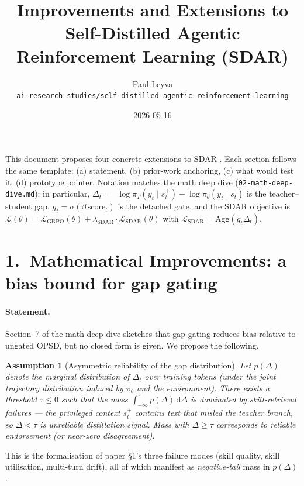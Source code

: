 \documentclass[11pt]{article}
\title{Improvements and Extensions to \\
       Self-Distilled Agentic Reinforcement Learning (SDAR)}
\author{Paul Leyva \\ \texttt{ai-research-studies/self-distilled-agentic-reinforcement-learning}}
\date{2026-05-16}
\newtheorem{assumption}{Assumption}
\begin{document}
\maketitle

\noindent
This document proposes four concrete extensions to SDAR \citep{lu2026sdar}.  Each
section follows the same template: (a) statement, (b) prior-work anchoring,
(c) what would test it, (d) prototype pointer.  Notation matches the math
deep dive (\texttt{02-math-deep-dive.md}); in particular, $\Delta_t \;=\;
\log\pi_T(y_t\mid s_t^+)\!-\!\log\pi_\theta(y_t\mid s_t)$ is the
teacher--student gap, $g_t = \sigma(\beta\,\mathrm{score}_t)$ is the detached
gate, and the SDAR objective is
$\mathcal{L}(\theta) = \mathcal{L}_{\mathrm{GRPO}}(\theta) +
\lambda_{\mathrm{SDAR}}\cdot \mathcal{L}_{\mathrm{SDAR}}(\theta)$
with $\mathcal{L}_{\mathrm{SDAR}} = \mathrm{Agg}(g_t \Delta_t)$.

\section*{1.\ Mathematical Improvements: a bias bound for gap gating}

\paragraph{Statement.}  Section~7 of the math deep dive sketches that
gap-gating reduces bias relative to ungated OPSD, but no closed form is
given.  We propose the following.

\begin{assumption}[Asymmetric reliability of the gap distribution]
\label{ass:asym}
Let $p(\Delta)$ denote the marginal distribution of $\Delta_t$ over training
tokens (under the joint trajectory distribution induced by $\pi_\theta$ and
the environment).  There exists a threshold $\tau \le 0$ such that the mass
$\int_{-\infty}^{\tau} p(\Delta)\,\mathrm{d}\Delta$ is dominated by
\emph{skill-retrieval failures} --- the privileged context $s_t^+$ contains
text that misled the teacher branch, so $\Delta < \tau$ is unreliable
distillation signal.  Mass with $\Delta \ge \tau$ corresponds to reliable
endorsement (or near-zero disagreement).
\end{assumption}

This is the formalisation of paper \S 1's three failure modes (skill quality,
skill utilisation, multi-turn drift), all of which manifest as
\emph{negative-tail} mass in $p(\Delta)$.
\end{document}
